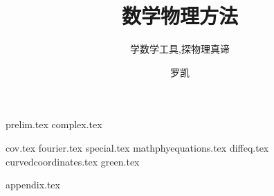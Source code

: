 \documentclass[
  lang=cn,
  10pt,
  mode=simple,
  color=blue, %
  ]{elegantbook}
\title{数学物理方法}
\subtitle{学数学工具,探物理真谛}
\author{罗凯}
\begin{document}


\maketitle
\frontmatter

\tableofcontents

\mainmatter


{prelim.tex}
{complex.tex}

{cov.tex}
{fourier.tex}
{special.tex}
{mathphyequations.tex}
{diffeq.tex}
{curvedcoordinates.tex}
{green.tex}

{appendix.tex}

\backmatter
\printbibliography[heading=bibintoc, title=\ebibname]
\printindex
\end{document}
